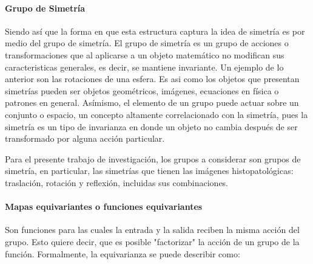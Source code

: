 \documentclass[12pt,letterpaper,final, openany]{scrbook}
\begin{document}
\paragraph{Grupo de Simetría}

Siendo así que la forma en que esta estructura captura la idea de simetría es por medio del grupo de simetría. El grupo de simetría es un grupo de acciones o transformaciones que al aplicarse a un objeto matemático no modifican sus caracteristicas generales, es decir, se mantiene invariante. Un ejemplo de lo anterior son las rotaciones de una esfera. Es asi como los objetos que presentan simetrías pueden ser objetos geométricos, imágenes, ecuaciones en física o patrones en general. Asímismo, el elemento de un grupo puede actuar sobre un conjunto o espacio, un concepto altamente correlacionado con la simetría, pues la simetría es un tipo de invarianza en donde un objeto no cambia después de ser transformado por alguna acción particular.

Para el presente trabajo de investigación, los grupos a considerar son grupos de simetría, en particular, las simetrías que tienen las imágenes histopatológicas: traslación, rotación y reflexión, incluidas sus combinaciones. 


\paragraph{Mapas equivariantes o funciones equivariantes}

Son funciones para las cuales la entrada y la salida reciben la misma acción del grupo. Esto quiere decir, que es posible "factorizar" la acción de un grupo de la función. Formalmente, la equivarianza se puede describir como:
\end{document}
